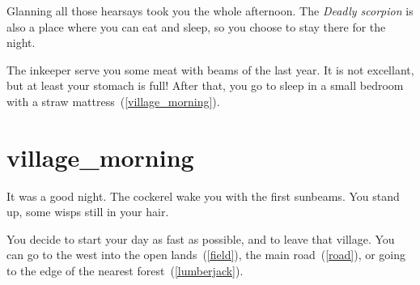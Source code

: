Glanning all those hearsays took you the whole afternoon. The \textit{Deadly
scorpion} is also a place where you can eat and sleep, so you choose to stay
there for the night.

The inkeeper serve you some meat with beams of the last year. It is not
excellant, but at least your stomach is full! After that, you go to sleep in a
small bedroom with a straw mattress~(\ref{village_morning}).

\section{village_morning}

It was a good night. The cockerel wake you with the first sunbeams. You stand
up, some wisps still in your hair.

You decide to start your day as fast as possible, and to leave that village.
You can go to the west into the open lands~(\ref{field}), the main
road~(\ref{road}), or going to the edge of the nearest
forest~(\ref{lumberjack}).

